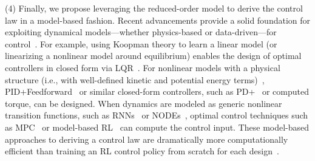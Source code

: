 %
(4) Finally, we propose leveraging the reduced-order model to derive the control law in a model-based fashion. Recent advancements provide a solid foundation for exploiting dynamical models—whether physics-based or data-driven—for control~\citep{della2023model, laschi2023learning}. For example, using Koopman theory to learn a linear model (or linearizing a nonlinear model around equilibrium) enables the design of optimal controllers in closed form via LQR~\citep{bruder2020data}. For nonlinear models with a physical structure (i.e., with well-defined kinetic and potential energy terms)~\citep{armanini2023soft, liu2024physics, stolzle2024input, alkayas2025soft, valadas2025learning}, PID+Feedforward~\citep{della2023model, stolzle2024experimental, stolzle2024input} or similar closed-form controllers, such as PD+~\citep{della2020model} or computed torque, can be designed. When dynamics are modeled as generic nonlinear transition functions, such as \glspl{RNN}~\citep{thuruthel2017learning} or \glspl{NODE}~\citep{kasaei2023data}, optimal control techniques such as \gls{MPC}~\citep{alora2023data} or model-based \gls{RL}~\citep{thuruthel2018model} can compute the control input. These model-based approaches to deriving a control law are dramatically more computationally efficient than training an \gls{RL} control policy from scratch for each design~\citep{bhatia2021evolution, wang2022curriculum, wang2023softzoo, wang2023preco}.


